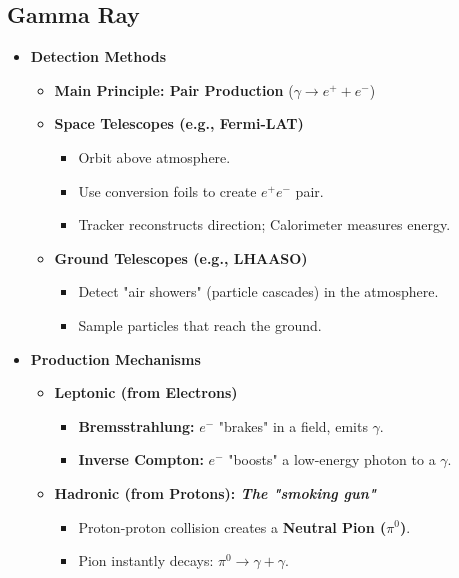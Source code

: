 \documentclass{sciposter}
\begin{document}
\begin{multicols}{3}
\section{Gamma Ray}

\begin{itemize}
  \item \textbf{Detection Methods}
    \begin{itemize}
      \item \textbf{Main Principle: Pair Production} ($\gamma \rightarrow e^+ + e^-$)
      \item \textbf{Space Telescopes (e.g., Fermi-LAT)}
        \begin{itemize}
          \item Orbit above atmosphere.
          \item Use conversion foils to create $e^+e^-$ pair.
          \item Tracker reconstructs direction; Calorimeter measures energy.
        \end{itemize}
      \item \textbf{Ground Telescopes (e.g., LHAASO)}
        \begin{itemize}
          \item Detect "air showers" (particle cascades) in the atmosphere.
          \item Sample particles that reach the ground.
        \end{itemize}
    \end{itemize}

  \item \textbf{Production Mechanisms}
    \begin{itemize}
      \item \textbf{Leptonic (from Electrons)}
        \begin{itemize}
          \item \textbf{Bremsstrahlung:} $e^-$ "brakes" in a field, emits $\gamma$.
          \item \textbf{Inverse Compton:} $e^-$ "boosts" a low-energy photon to a $\gamma$.
        \end{itemize}
      \item \textbf{Hadronic (from Protons): \textit{The "smoking gun"}}
        \begin{itemize}
          \item Proton-proton collision creates a \textbf{Neutral Pion ($\pi^0$)}.
          \item Pion instantly decays: $\pi^0 \rightarrow \gamma + \gamma$.
        \end{itemize}
    \end{itemize}


\end{itemize}
\end{multicols}
\end{document}
